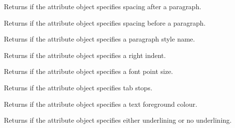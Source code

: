 
Returns \true if the attribute object specifies spacing after a paragraph.

\label{wxrichtextattrhasparagraphspacingbefore}


Returns \true if the attribute object specifies spacing before a paragraph.

\label{wxrichtextattrhasparagraphstylename}


Returns \true if the attribute object specifies a paragraph style name.

\label{wxrichtextattrhasrightindent}


Returns \true if the attribute object specifies a right indent.

\label{wxrichtextattrhassize}


Returns \true if the attribute object specifies a font point size.

\label{wxrichtextattrhastabs}


Returns \true if the attribute object specifies tab stops.

\label{wxrichtextattrhastextcolour}


Returns \true if the attribute object specifies a text foreground colour.

\label{wxrichtextattrhasunderlined}


Returns \true if the attribute object specifies either underlining or no underlining.

\label{wxrichtextattrhasweight}


